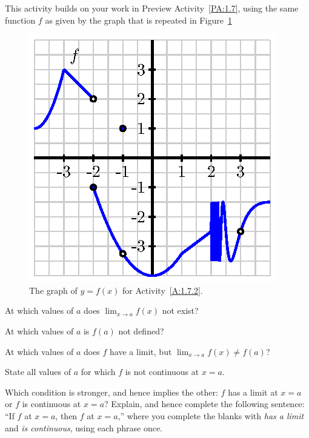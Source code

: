 \begin{activity} \label{A:1.7.2}
This activity builds on your work in Preview Activity~\ref{PA:1.7}, using the same function $f$ as given by the graph that is repeated in Figure~\ref{F:1.7.A2}
\begin{figure}[h]
\begin{center}
\includegraphics{figures/1_7_PA1.eps}
\caption{The graph of $y = f(x)$ for Activity~\ref{A:1.7.2}.} \label{F:1.7.A2}
\end{center}
\end{figure}
\ba
	\item At which values of $a$ does $\lim_{x \to a} f(x)$ not exist?
	\item At which values of $a$ is $f(a)$ not defined?
	\item At which values of $a$ does $f$ have a limit, but $\lim_{x \to a} f(x) \ne f(a)$?
	\item State all values of $a$ for which $f$ is not continuous at $x = a$.
	\item Which condition is stronger, and hence implies the other:   $f$  has a limit at $x = a$ or  $f$ is continuous at $x = a$?  Explain, and hence complete the following sentence:  ``If $f$ \underline{\hspace{1.5in}} at $x = a$, then $f$ \underline{\hspace{1.5in}} at $x = a$,'' where you complete the blanks with \emph{has a limit} and \emph{is continuous}, using each phrase once.
\ea
\end{activity}
